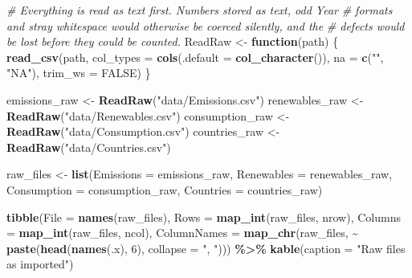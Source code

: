 \documentclass[
]{article}
\newenvironment{Shaded}{\begin{snugshade}}{\end{snugshade}}
\newcommand{\AttributeTok}[1]{\textcolor[rgb]{0.13,0.29,0.53}{#1}}
\newcommand{\CommentTok}[1]{\textcolor[rgb]{0.56,0.35,0.01}{\textit{#1}}}
\newcommand{\ConstantTok}[1]{\textcolor[rgb]{0.56,0.35,0.01}{#1}}
\newcommand{\ControlFlowTok}[1]{\textcolor[rgb]{0.13,0.29,0.53}{\textbf{#1}}}
\newcommand{\DecValTok}[1]{\textcolor[rgb]{0.00,0.00,0.81}{#1}}
\newcommand{\FunctionTok}[1]{\textcolor[rgb]{0.13,0.29,0.53}{\textbf{#1}}}
\newcommand{\NormalTok}[1]{#1}
\newcommand{\OtherTok}[1]{\textcolor[rgb]{0.56,0.35,0.01}{#1}}
\newcommand{\SpecialCharTok}[1]{\textcolor[rgb]{0.81,0.36,0.00}{\textbf{#1}}}
\newcommand{\StringTok}[1]{\textcolor[rgb]{0.31,0.60,0.02}{#1}}
\begin{document}
\begin{Shaded}
\begin{Highlighting}[]
\CommentTok{\# Everything is read as text first. Numbers stored as text, odd Year}
\CommentTok{\# formats and stray whitespace would otherwise be coerced silently, and the}
\CommentTok{\# defects would be lost before they could be counted.}
\NormalTok{ReadRaw }\OtherTok{\textless{}{-}} \ControlFlowTok{function}\NormalTok{(path) \{}
  \FunctionTok{read\_csv}\NormalTok{(path, }\AttributeTok{col\_types =} \FunctionTok{cols}\NormalTok{(}\AttributeTok{.default =} \FunctionTok{col\_character}\NormalTok{()),}
           \AttributeTok{na =} \FunctionTok{c}\NormalTok{(}\StringTok{""}\NormalTok{, }\StringTok{"NA"}\NormalTok{), }\AttributeTok{trim\_ws =} \ConstantTok{FALSE}\NormalTok{)}
\NormalTok{\}}

\NormalTok{emissions\_raw   }\OtherTok{\textless{}{-}} \FunctionTok{ReadRaw}\NormalTok{(}\StringTok{"data/Emissions.csv"}\NormalTok{)}
\NormalTok{renewables\_raw  }\OtherTok{\textless{}{-}} \FunctionTok{ReadRaw}\NormalTok{(}\StringTok{"data/Renewables.csv"}\NormalTok{)}
\NormalTok{consumption\_raw }\OtherTok{\textless{}{-}} \FunctionTok{ReadRaw}\NormalTok{(}\StringTok{"data/Consumption.csv"}\NormalTok{)}
\NormalTok{countries\_raw   }\OtherTok{\textless{}{-}} \FunctionTok{ReadRaw}\NormalTok{(}\StringTok{"data/Countries.csv"}\NormalTok{)}

\NormalTok{raw\_files }\OtherTok{\textless{}{-}} \FunctionTok{list}\NormalTok{(}\AttributeTok{Emissions =}\NormalTok{ emissions\_raw, }\AttributeTok{Renewables =}\NormalTok{ renewables\_raw,}
                  \AttributeTok{Consumption =}\NormalTok{ consumption\_raw, }\AttributeTok{Countries =}\NormalTok{ countries\_raw)}

\FunctionTok{tibble}\NormalTok{(}\AttributeTok{File =} \FunctionTok{names}\NormalTok{(raw\_files),}
       \AttributeTok{Rows =} \FunctionTok{map\_int}\NormalTok{(raw\_files, nrow),}
       \AttributeTok{Columns =} \FunctionTok{map\_int}\NormalTok{(raw\_files, ncol),}
       \AttributeTok{ColumnNames =} \FunctionTok{map\_chr}\NormalTok{(raw\_files, }\SpecialCharTok{\textasciitilde{}} \FunctionTok{paste}\NormalTok{(}\FunctionTok{head}\NormalTok{(}\FunctionTok{names}\NormalTok{(.x), }\DecValTok{6}\NormalTok{),}
                                                \AttributeTok{collapse =} \StringTok{", "}\NormalTok{))) }\SpecialCharTok{\%\textgreater{}\%}
  \FunctionTok{kable}\NormalTok{(}\AttributeTok{caption =} \StringTok{"Raw files as imported"}\NormalTok{)}
\end{Highlighting}
\end{Shaded}
\end{document}
